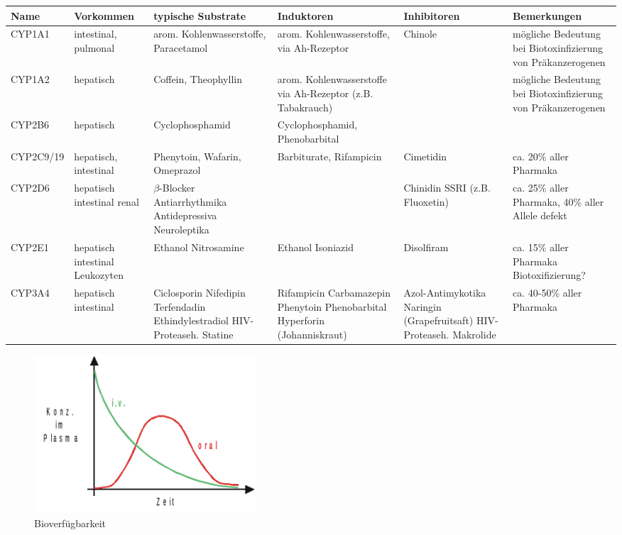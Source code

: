 \documentclass[10pt,a4paper]{report}
\begin{document}
\begin{tabularx}{\textwidth}{X|XXXXX}
  Name & Vorkommen & typische Substrate & Induktoren & Inhibitoren	& Bemerkungen \\\hline \hline
  CYP1A1&intestinal, pulmonal&arom. Kohlenwasserstoffe, Paracetamol&arom. Kohlenwasserstoffe, via Ah-Rezeptor&Chinole&mögliche Bedeutung bei Biotoxinfizierung von Präkanzerogenen \\
  CYP1A2&hepatisch&Coffein, Theophyllin&arom. Kohlenwasserstoffe via Ah-Rezeptor (z.B. Tabakrauch)&&mögliche Bedeutung bei Biotoxinfizierung von Präkanzerogenen \\
  CYP2B6&hepatisch&Cyclophosphamid&Cyclophosphamid, Phenobarbital&&\\
  CYP2C9/19&hepatisch, intestinal&Phenytoin, Wafarin, Omeprazol&Barbiturate, Rifampicin&Cimetidin&ca. 20\% aller Pharmaka\\
  CYP2D6&hepatisch intestinal renal& $\beta$-Blocker Antiarrhythmika Antidepressiva Neuroleptika&&Chinidin SSRI (z.B. Fluoxetin)& ca. 25\% aller Pharmaka, 40\% aller Allele defekt\\
  CYP2E1&hepatisch intestinal Leukozyten&Ethanol Nitrosamine&Ethanol Isoniazid& Disolfiram& ca. 15\% aller Pharmaka Biotoxifizierung?\\
  CYP3A4&hepatisch intestinal& Ciclosporin Nifedipin Terfendadin Ethindylestradiol HIV-Proteaseh. Statine&Rifampicin Carbamazepin Phenytoin Phenobarbital Hyperforin (Johanniskraut)& Azol-Antimykotika Naringin (Grapefruitsaft) HIV-Proteaseh. Makrolide& ca. 40-50\% aller Pharmaka\\ \hline  
\end{tabularx}
\begin{figure}[h]
	\centering 
	\includegraphics[width=0.4\textwidth]{konzentrationzeit.png} 
	\caption{Bioverfügbarkeit} 
	\label{fig:Bioverfuegbarkeit}
\end{figure}
\end{document}
